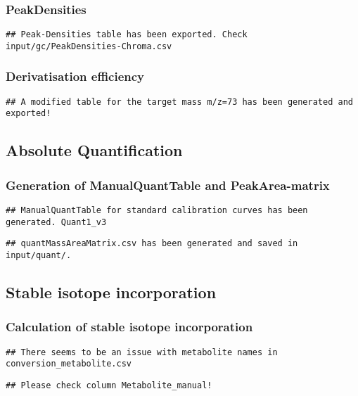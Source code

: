 \documentclass[9pt,]{article}
\begin{document}
\subsubsection{PeakDensities}\label{peakdensities}

\begin{verbatim}
## Peak-Densities table has been exported. Check input/gc/PeakDensities-Chroma.csv
\end{verbatim}

\subsubsection{Derivatisation
efficiency}\label{derivatisation-efficiency}

\begin{verbatim}
## A modified table for the target mass m/z=73 has been generated and exported!
\end{verbatim}

\subsection{Absolute Quantification}\label{absolute-quantification}

\subsubsection{Generation of ManualQuantTable and
PeakArea-matrix}\label{generation-of-manualquanttable-and-peakarea-matrix}

\begin{verbatim}
## ManualQuantTable for standard calibration curves has been generated. Quant1_v3
\end{verbatim}

\begin{verbatim}
## quantMassAreaMatrix.csv has been generated and saved in input/quant/.
\end{verbatim}

\subsection{Stable isotope
incorporation}\label{stable-isotope-incorporation}

\subsubsection{Calculation of stable isotope
incorporation}\label{calculation-of-stable-isotope-incorporation}

\begin{verbatim}
## There seems to be an issue with metabolite names in conversion_metabolite.csv
\end{verbatim}

\begin{verbatim}
## Please check column Metabolite_manual!
\end{verbatim}
\newpage
\singlespacing 
\end{document}
